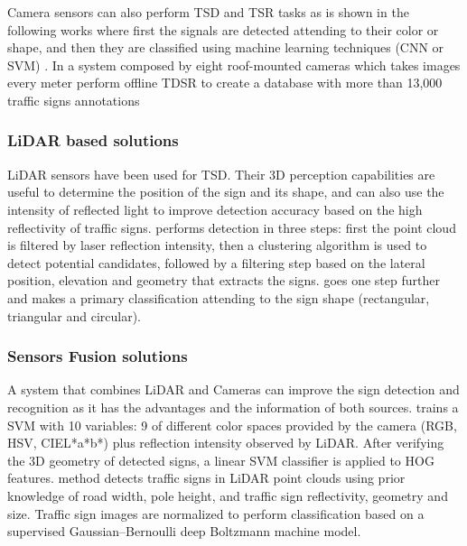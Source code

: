 \documentclass[journal]{IEEEtran}
\begin{document}
Camera sensors can also perform TSD and TSR tasks as is 
shown in the following works where first the signals are detected attending to
their color or shape, and then they are classified using machine learning techniques (CNN or SVM)
\cite{miyata2017automatic, yang2016towards, wali2015automatic}. In \cite{timofte2014multi}
a system composed by eight roof-mounted cameras which takes images every meter
perform offline TDSR to create a database with more than 13,000 traffic signs annotations


\subsubsection{LiDAR based solutions}
LiDAR sensors have been used for TSD. Their 3D perception capabilities are 
useful to determine the position of the sign and its shape, and can also use 
the intensity of reflected light to improve detection accuracy based on the
high reflectivity of traffic signs. \cite{gargoum2017automated} 
performs detection in three steps: first the point cloud is filtered by 
laser reflection intensity, then a clustering algorithm is used to detect 
potential candidates, followed by a filtering step based on the lateral 
position, elevation and geometry that extracts the signs. 
\cite{weng2016road} goes one step further and makes a primary 
classification attending to the sign shape (rectangular, triangular and 
circular).

\subsubsection{Sensors Fusion solutions}
A system that combines LiDAR and Cameras can improve the sign detection and 
recognition as it has the advantages and the information of both sources. 
\cite{zhou2014lidar} trains a SVM with 10 variables: 9 of different color 
spaces provided by the camera (RGB, HSV, CIEL*a*b*) plus reflection intensity 
observed by LiDAR. After verifying the 3D geometry of detected signs, a linear
SVM classifier is applied to HOG features.
\cite{guan2018robust} method detects traffic signs in LiDAR point clouds
using prior knowledge of road width, pole height, and traffic sign reflectivity, 
geometry and size. Traffic sign images are normalized to perform classification 
based on a supervised Gaussian–Bernoulli deep Boltzmann machine model.
\end{document}
